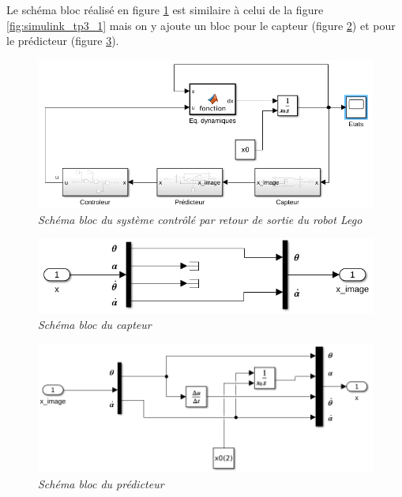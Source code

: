 \documentclass[11pt,french]{article} %
\begin{document}
Le schéma bloc réalisé en figure \ref{fig:simulink_tp3_2_systeme} est similaire à celui de la figure \ref{fig:simulink_tp3_1} mais on y ajoute un bloc pour le capteur (figure \ref{fig:simulink_tp3_2_capteur}) et pour le prédicteur (figure \ref{fig:simulink_tp3_2_predicteur}). \\

\begin{figure}[H]
    \centering
    \includegraphics[width=12cm]{simulink_tp3_2_systeme.png} 
		\caption{\textit{Schéma bloc du système contrôlé par retour de sortie du robot Lego}}
		\label{fig:simulink_tp3_2_systeme}
\end{figure}
\vspace{0.5cm}

\begin{figure}[H]
    \centering
    \includegraphics[width=12cm]{simulink_tp3_2_capteur.png} 
		\caption{\textit{Schéma bloc du capteur}}
		\label{fig:simulink_tp3_2_capteur}
\end{figure}
\vspace{0.5cm}

\begin{figure}[H]
    \centering
    \includegraphics[width=12cm]{simulink_tp3_2_predicteur.png} 
		\caption{\textit{Schéma bloc du prédicteur}}
		\label{fig:simulink_tp3_2_predicteur}
\end{figure}
\vspace{0.5cm}
\end{document}
